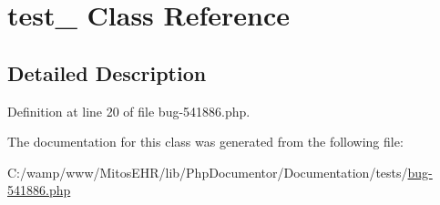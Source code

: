 \hypertarget{classtest__541886}{\section{test\-\_ \-Class \-Reference}
\label{classtest__541886}
}


\subsection{\-Detailed \-Description}


\-Definition at line 20 of file bug-\/541886.\-php.



\-The documentation for this class was generated from the following file\-:\begin{DoxyCompactItemize}
\item 
\-C\-:/wamp/www/\-Mitos\-E\-H\-R/lib/\-Php\-Documentor/\-Documentation/tests/\hyperlink{bug-541886_8php}{bug-\/541886.\-php}\end{DoxyCompactItemize}
